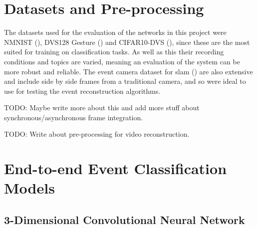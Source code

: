 \section{Datasets and Pre-processing}

The datasets used for the evaluation of the networks in this project were NMNIST (), DVS128 Gesture () and CIFAR10-DVS (), since these are the most suited for training on classification tasks. As well as this their recording conditions and topics are varied, meaning an evaluation of the system can be more robust and reliable. The event camera dataset for slam () are also extensive and include side by side frames from a traditional camera, and so were ideal to use for testing the event reconstruction algorithms.

\color{red} TODO: Maybe write more about this and add more stuff about synchronous/asynchronous frame integration. \color{black}

\color{red} TODO: Write about pre-processing for video reconstruction. \color{black}

\section{End-to-end Event Classification Models}

\subsection{3-Dimensional Convolutional Neural Network}

